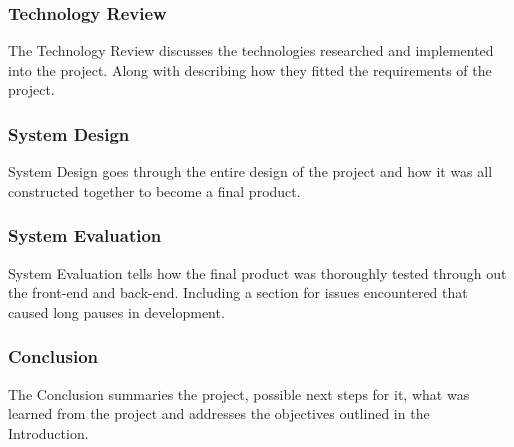 \subsubsection{Technology Review}
The Technology Review discusses the technologies researched and implemented into the project. Along with describing how they fitted the requirements of the project.

\subsubsection{System Design}
System Design goes through the entire design of the project and how it was all constructed together to become a final product.

\subsubsection{System Evaluation}
System Evaluation tells how the final product was thoroughly tested through out the front-end and back-end. Including a section for issues encountered that caused long pauses in development.

\subsubsection{Conclusion}
The Conclusion summaries the project, possible next steps for it, what was learned from the project and addresses the objectives outlined in the Introduction. 
